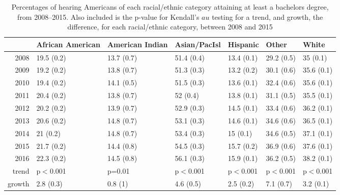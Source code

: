 \documentclass{article}\usepackage[]{graphicx}\usepackage[]{color}
\begin{document}
\begin{table}[ht]
\centering
\begin{tabular}{rllllll}
  \hline
 & African American & American Indian & Asian/PacIsl & Hispanic & Other & White \\
  \hline
2008 & 19.5 (0.2) & 13.7 (0.7) & 51.4 (0.4) & 13.4 (0.1) & 29.2 (0.5) & 35 (0.1) \\
  2009 & 19.2 (0.2) & 13.8 (0.7) & 51.3 (0.3) & 13.2 (0.2) & 30.1 (0.6) & 35.6 (0.1) \\
  2010 & 19.4 (0.2) & 14.1 (0.5) & 51.5 (0.3) & 13.6 (0.1) & 32.4 (0.6) & 35.6 (0.1) \\
  2011 & 20.4 (0.2) & 13.8 (0.7) & 52 (0.4) & 13.8 (0.1) & 31.1 (0.5) & 35.5 (0.1) \\
  2012 & 20.2 (0.2) & 13.9 (0.7) & 52.9 (0.3) & 14.5 (0.1) & 33.4 (0.6) & 36.2 (0.1) \\
  2013 & 20.6 (0.2) & 14.8 (0.7) & 53.1 (0.3) & 14.6 (0.1) & 34.6 (0.6) & 36.5 (0.1) \\
  2014 & 21 (0.2) & 14.8 (0.7) & 53.4 (0.3) & 15 (0.1) & 34.6 (0.5) & 37.1 (0.1) \\
  2015 & 21.7 (0.2) & 14.4 (0.8) & 54.5 (0.3) & 15.7 (0.2) & 36.9 (0.6) & 37.6 (0.1) \\
  2016 & 22.3 (0.2) & 14.5 (0.8) & 56.1 (0.3) & 15.9 (0.1) & 36.2 (0.5) & 38.2 (0.1) \\
  trend & p$<$0.001 & p=0.01 & p$<$0.001 & p$<$0.001 & p$<$0.001 & p$<$0.001 \\
  growth & 2.8 (0.3) & 0.8 (1) & 4.6 (0.5) & 2.5 (0.2) & 7.1 (0.7) & 3.2 (0.1) \\
   \hline
\end{tabular}
\caption{Percentages of hearing Americans of each racial/ethnic category attaining at least a bachelors degree, from 2008--2015. Also included is the p-value for Kendall's $	au$ testing for a trend, and growth, the difference, for each racial/ethnic category, between 2008 and 2015}
\label{tab:bachRaceH}
\end{table}
\end{document}

